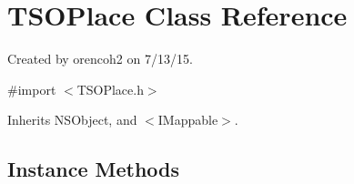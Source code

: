 \hypertarget{interface_t_s_o_place}{}\section{T\+S\+O\+Place Class Reference}
\label{interface_t_s_o_place}


Created by orencoh2 on 7/13/15.  




{\ttfamily \#import $<$T\+S\+O\+Place.\+h$>$}



Inherits N\+S\+Object, and $<$\+I\+Mappable$>$.

\subsection*{Instance Methods}

